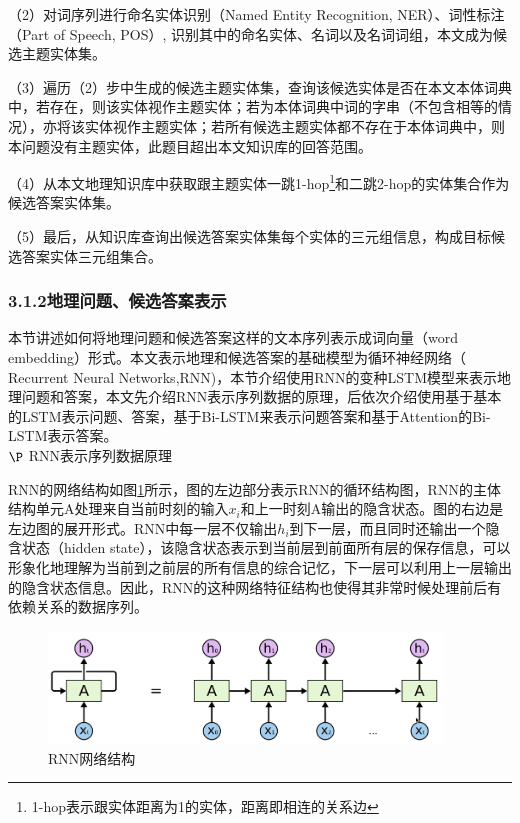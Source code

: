 （2）对词序列进行命名实体识别（Named Entity Recognition, NER）、词性标注（Part  of  Speech, POS）, 识别其中的命名实体、名词以及名词词组，本文成为候选主题实体集。

（3）遍历（2）步中生成的候选主题实体集，查询该候选实体是否在本文本体词典中，若存在，则该实体视作主题实体；若为本体词典中词的字串（不包含相等的情况），亦将该实体视作主题实体；若所有候选主题实体都不存在于本体词典中，则本问题没有主题实体，此题目超出本文知识库的回答范围。

（4）从本文地理知识库中获取跟主题实体一跳1-hop\footnote{1-hop表示跟实体距离为1的实体，距离即相连的关系边}和二跳2-hop的实体集合作为候选答案实体集。

（5）最后，从知识库查询出候选答案实体集每个实体的三元组信息，构成目标候选答案实体三元组集合。


\subsubsection{3.1.2\quad 地理问题、候选答案表示}
本节讲述如何将地理问题和候选答案这样的文本序列表示成词向量（word embedding）形式。本文表示地理和候选答案的基础模型为循环神经网络（ Recurrent Neural Networks,RNN)，本节介绍使用RNN的变种LSTM模型来表示地理问题和答案，本文先介绍RNN表示序列数据的原理，后依次介绍使用基于基本的LSTM表示问题、答案，基于Bi-LSTM来表示问题答案和基于Attention的Bi-LSTM表示答案。
\\

$\P$ RNN表示序列数据原理

RNN的网络结构如图\ref{fig:rnn_structure}所示，图的左边部分表示RNN的循环结构图，RNN的主体结构单元A处理来自当前时刻的输入$x_{i}$和上一时刻A输出的隐含状态。图的右边是左边图的展开形式。RNN中每一层不仅输出$h_{i}$到下一层，而且同时还输出一个隐含状态（hidden state），该隐含状态表示到当前层到前面所有层的保存信息，可以形象化地理解为当前到之前层的所有信息的综合记忆，下一层可以利用上一层输出的隐含状态信息。因此，RNN的这种网络特征结构也使得其非常时候处理前后有依赖关系的数据序列。

\begin{figure}[!htb]
	\centering\includegraphics[height=3cm]{resource/rnn_structure}
	\caption{RNN网络结构}
	\label{fig:rnn_structure}
\end{figure}

